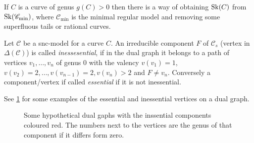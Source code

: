 If $C$ is a curve of genus $g(C) > 0$ then there is a way of obtaining $\operatorname{Sk}(C)$ from $\operatorname{Sk}(\mathscr C_\text{min} )$, where $\mathscr C _\text{min}$ is the minimal regular model and removing some superfluous tails or rational curves.  

\begin{definition}
	Let $\mathscr C$ be a snc-model for a curve $C$. 
	An irreducible component $F$ of $\mathscr C_s$ (vertex in $\Delta(\mathscr C)$) is called \emph{inessesential}, if in the dual graph it belongs to a path of vertices $v_1, \ldots, v_n$ of genus $0$ with the valency $v(v_1) = 1$, $v(v_{2}) = 2, \ldots, v(v_{n-1}) = 2, v(v_n) > 2$ and $F \ne v_n$. 
	Conversely a component/vertex if called \emph{essential} if it is not inessential. 
\end{definition}
See \cref{fig:inessential_components} for some examples of the essential and inessential vertices on a dual graph. 

\begin{figure}[h]
    \centering
    \caption{Some hypothetical dual gaphs with the inssential components coloured red. 
    The numbers next to the vertices are the genus of that component if it differs form zero.}
    \label{fig:inessential_components}
\end{figure}

